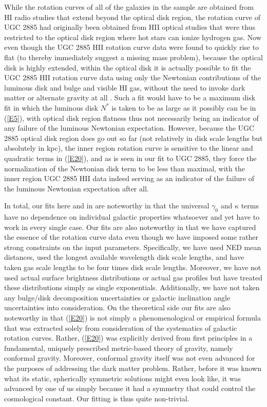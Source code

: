 \documentclass[preprint,aps]{revtex4}
\begin{document}
While the rotation curves of all of the galaxies in the sample are obtained from HI radio studies that extend beyond the optical disk region, the rotation curve of UGC 2885 had originally been obtained from HII optical studies \cite{Rubin1980} that were thus restricted to the optical disk region where hot stars can ionize hydrogen gas. Now even though the UGC 2885 HII rotation curve data were found to quickly rise to flat (to thereby immediately suggest a missing mass problem), because the optical disk is highly extended, within the optical disk it is actually possible to fit the UGC 2885 HII rotation curve data using only the Newtonian contributions of the luminous disk and bulge and visible HI gas, without the need to invoke dark matter or alternate gravity at all \cite{Kent1986}.  Such a fit would have to be a maximum disk fit in which the luminous disk $N^*$ is taken to be as large as it possibly can be in (\ref{E5}), with optical disk region flatness thus not necessarily being an indicator of any failure of the luminous Newtonian expectation. However, because the UGC 2885 optical disk region does go out so far (not relatively in disk scale lengths but absolutely in kpc), the inner region rotation curve is sensitive to the linear and quadratic terms in (\ref{E20}), and as is seen in our fit to UGC 2885, they force the normalization of the Newtonian disk term to be less than maximal, with the inner region UGC 2885 HII data indeed serving as an indicator of the failure of the luminous Newtonian expectation after all. 




In total, our fits here and in \cite{Mannheim2010b} are noteworthy in that the universal $\gamma_0$ and $\kappa$ terms have no dependence on individual galactic properties whatsoever and yet have to work in every single case. Our fits are also noteworthy in that we have captured the essence of the rotation curve data even though we have imposed some rather strong constraints on the input parameters. Specifically, we have used NED mean distances, used the longest available wavelength disk scale lengths, and have taken gas scale lengths to be four times disk scale lengths. Moreover, we have not used actual surface brightness distributions or actual gas profiles but have treated these distributions simply as single exponentials. Additionally, we have not taken any bulge/disk decomposition uncertainties or galactic inclination angle uncertainties into consideration. On the theoretical side our fits are also noteworthy in that (\ref{E20}) is not simply a phenomenological or empirical formula that was extracted solely from consideration of the systematics of galactic rotation curves. Rather, (\ref{E20}) was explicitly derived from first principles in a fundamental, uniquely prescribed metric-based theory of gravity, namely conformal gravity. Moreover, conformal gravity  itself was not even advanced for the purposes of addressing the dark matter problem. Rather, before it was known what its static, spherically symmetric solutions might even look like, it was advanced by one of us \cite{Mannheim1990} simply because it had a symmetry that could control the cosmological constant. Our fitting is thus quite non-trivial.
\end{document}
